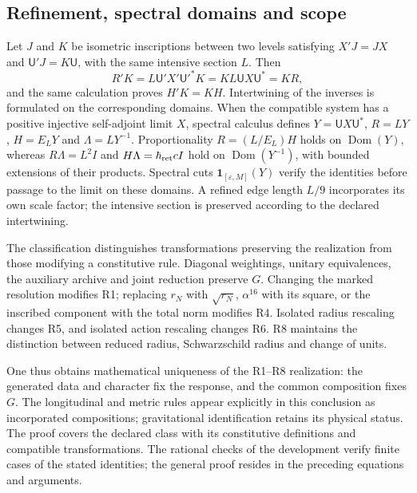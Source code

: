 \subsection{Refinement, spectral domains and scope}

Let \(J\) and \(K\) be isometric inscriptions between two levels satisfying \(X'J=JX\) and \(\mathsf U'J=K\mathsf U\), with the same intensive section \(L\). Then
\[
 R'K=L\mathsf U'X'\mathsf U'^*K
     =KL\mathsf U X\mathsf U^*=KR,
\]
and the same calculation proves \(H'K=KH\). Intertwining of the inverses is formulated on the corresponding domains. When the compatible system has a positive injective self-adjoint limit \(X\), spectral calculus defines \(Y=\mathsf U X\mathsf U^*\), \(R=LY\), \(H=E_{L}Y\) and \(\Lambda=LY^{-1}\). Proportionality \(R=(L/E_{L})H\) holds on \(\operatorname{Dom}(Y)\), whereas \(R\Lambda=L^2I\) and \(H\Lambda=\hbar_{\rm ret}cI\) hold on \(\operatorname{Dom}(Y^{-1})\), with bounded extensions of their products. Spectral cuts \(\mathbf1_{[\varepsilon,M]}(Y)\) verify the identities before passage to the limit on these domains. A refined edge length \(L/9\) incorporates its own scale factor; the intensive section is preserved according to the declared intertwining.

The classification distinguishes transformations preserving the realization from those modifying a constitutive rule. Diagonal weightings, unitary equivalences, the auxiliary archive and joint reduction preserve \(G\). Changing the marked resolution modifies R1; replacing \(r_N\) with \(\sqrt{r_N}\), \(\alpha^{16}\) with its square, or the inscribed component with the total norm modifies R4. Isolated radius rescaling changes R5, and isolated action rescaling changes R6. R8 maintains the distinction between reduced radius, Schwarzschild radius and change of units.

One thus obtains mathematical uniqueness of the R1--R8 realization: the generated data and character fix the response, and the common composition fixes \(G\). The longitudinal and metric rules appear explicitly in this conclusion as incorporated compositions; gravitational identification retains its physical status. The proof covers the declared class with its constitutive definitions and compatible transformations. The rational checks of the development verify finite cases of the stated identities; the general proof resides in the preceding equations and arguments.

